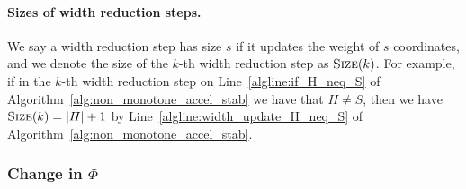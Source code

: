 \documentclass[11pt]{article}
\begin{document}
\paragraph{Sizes of width reduction steps.}
We say a width reduction step has size $s$ if it updates the weight of $s$ coordinates, and we denote the size of the $k$-th width reduction step as $\textsc{Size}(k)$. For example, if in the $k$-th width reduction step on Line~\ref{algline:if_H_neq_S} of Algorithm~\ref{alg:non_monotone_accel_stab} we have that $H \neq S$, then we have $\textsc{Size}(k) = |H|+1$ by Line~\ref{algline:width_update_H_neq_S} of Algorithm~\ref{alg:non_monotone_accel_stab}.


\subsubsection{Change in \texorpdfstring{$\Phi$}{Phi}}
\end{document}
